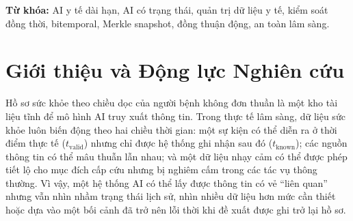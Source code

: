 \documentclass[11pt]{article}
\begin{document}
\textbf{Từ khóa:} AI y tế dài hạn, AI có trạng thái, quản trị dữ liệu y tế, kiểm soát đồng thời, bitemporal, Merkle snapshot, đồng thuận động, an toàn lâm sàng.

\section{Giới thiệu và Động lực Nghiên cứu}
Hồ sơ sức khỏe theo chiều dọc của người bệnh không đơn thuần là một kho tài liệu tĩnh để mô hình AI truy xuất thông tin. Trong thực tế lâm sàng, dữ liệu sức khỏe luôn biến động theo hai chiều thời gian: một sự kiện có thể diễn ra ở thời điểm thực tế ($t_{\text{valid}}$) nhưng chỉ được hệ thống ghi nhận sau đó ($t_{\text{known}}$); các nguồn thông tin có thể mâu thuẫn lẫn nhau; và một dữ liệu nhạy cảm có thể được phép tiết lộ cho mục đích cấp cứu nhưng bị nghiêm cấm trong các tác vụ thông thường. Vì vậy, một hệ thống AI có thể lấy được thông tin có vẻ ``liên quan'' nhưng vẫn nhìn nhầm trạng thái lịch sử, nhìn nhiều dữ liệu hơn mức cần thiết hoặc dựa vào một bối cảnh đã trở nên lỗi thời khi đề xuất được ghi trở lại hồ sơ.
\end{document}
